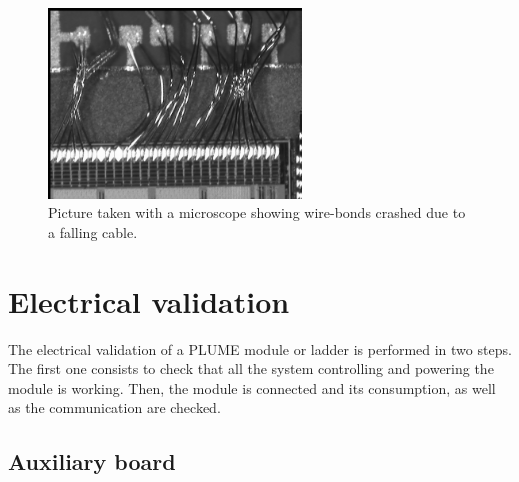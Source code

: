 
  \begin{figure}[!h]
    \centering
    \includegraphics[width=0.6\textwidth]{Pictures/labTests/crash_bonds.jpg}
    \caption{Picture taken with a microscope showing wire-bonds crashed due to a falling cable.}
    \label{fig:wireBondsCrashed}
  \end{figure}

\section{Electrical validation}

  The electrical validation of a \gls{PLUME} module or ladder is performed in two steps.
  The first one consists to check that all the system controlling and powering the module is working. 
  Then, the module is connected and its consumption, as well as the communication are checked.

  \subsection{Auxiliary board}

